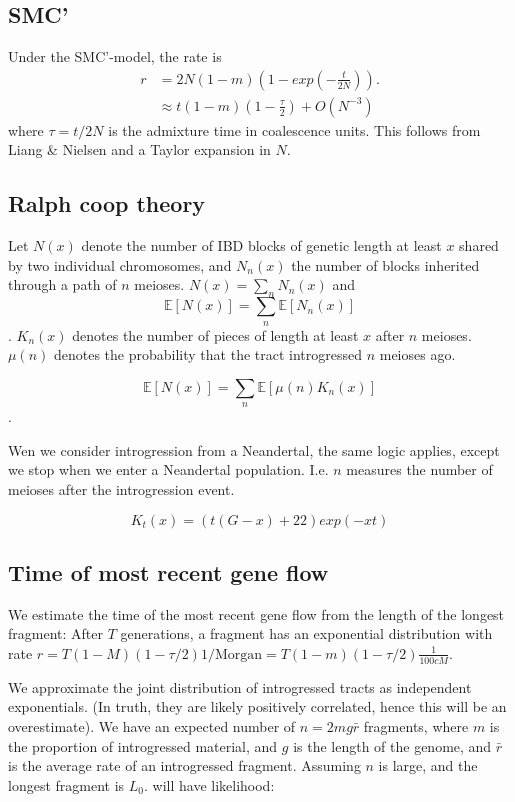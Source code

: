 \documentclass[10pt,a4paper]{article}
\newcommand{\BE}[1]{\mathbb{E}\left[#1\right]}
\begin{document}
\subsection{SMC'}
Under the SMC'-model, the rate is 
\begin{align}
r &= 2 N (1-m) \left(1 - exp\left({-\frac{t}{2N}}\right)\right).\\
& \approx t (1-m) \left( 1- \frac{\tau}{2}\right) + O\left(N^{-3}\right)
\end{align}
where $\tau = t/2N$ is the admixture time in coalescence units. This follows from Liang \& Nielsen and a Taylor expansion in $N$.


\subsection{Ralph coop theory}
Let $N(x)$ denote the number of IBD blocks of genetic length at least $x$ shared by two individual chromosomes, and $N_n(x)$ the number of blocks inherited through a path of $n$ meioses. $N(x) = \sum_n N_n(x)$ and
$$\BE{N(x)} = \sum_n \BE{N_n(x)}$$. $K_n(x)$ denotes the number of pieces of length at least $x$ after $n$ meioses. $\mu(n)$ denotes the probability that the tract introgressed $n$ meioses ago. 

$$\BE{N(x)} = \sum_n \BE{\mu(n) K_n (x)}$$.

Wen we consider introgression from a Neandertal, the same logic applies, except we stop when we enter a Neandertal population. I.e. $n$ measures the number of meioses after the introgression event.

$$K_t(x) = (t(G - x) +22) exp(-x t)$$


\subsection{Time of most recent gene flow}
We estimate the time of the most recent gene flow from the length of the longest fragment:
After $T$ generations, a fragment has an exponential distribution with rate $r=T(1-M)(1-\tau/2) 1/\text{Morgan} = T(1-m) (1-\tau/2)\frac{1}{100 cM}$.

We approximate the joint distribution of introgressed tracts as independent exponentials. (In truth, they are likely positively correlated, hence this will be an overestimate). We have an expected number of $n=2mg\bar{r}$ fragments, where $m$ is the proportion of introgressed material, and $g$ is the length of the genome, and $\bar{r}$ is the average rate of an introgressed fragment. Assuming $n$ is large, and the longest fragment is $L_0$. will have likelihood:  
\end{document}
